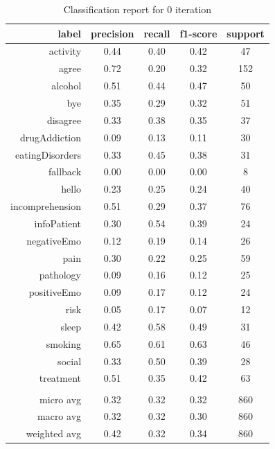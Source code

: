 \documentclass[11pt]{article}
\begin{document}
\begin{table}[htb]
\begin{center}
\begin{tabular}{ |r|c|c|c|c| }
\hline
label 			& precision & recall & f1-score & support\\ \hline 
activity 		& 0.44 & 0.40 & 0.42 &  47\\ \hline 
agree 			& 0.72 & 0.20 & 0.32 & 152\\ \hline 
alcohol 		& 0.51 & 0.44 & 0.47 &  50\\ \hline 
bye 			& 0.35 & 0.29 & 0.32 &  51\\ \hline 
disagree 		& 0.33 & 0.38 & 0.35 &  37\\ \hline 
drugAddiction 	& 0.09 & 0.13 & 0.11 &  30\\ \hline 
eatingDisorders & 0.33 & 0.45 & 0.38 &  31\\ \hline 
fallback 		& 0.00 & 0.00 & 0.00 &   8\\ \hline 
hello 			& 0.23 & 0.25 & 0.24 &  40\\ \hline 
incomprehension & 0.51 & 0.29 & 0.37 &  76\\ \hline 
infoPatient 	& 0.30 & 0.54 & 0.39 &  24\\ \hline 
negativeEmo 	& 0.12 & 0.19 & 0.14 &  26\\ \hline 
pain 			& 0.30 & 0.22 & 0.25 &  59\\ \hline 
pathology 		& 0.09 & 0.16 & 0.12 &  25\\ \hline 
positiveEmo 	& 0.09 & 0.17 & 0.12 &  24\\ \hline 
risk 			& 0.05 & 0.17 & 0.07 &  12\\ \hline 
sleep 			& 0.42 & 0.58 & 0.49 &  31\\ \hline 
smoking 		& 0.65 & 0.61 & 0.63 &  46\\ \hline 
social 			& 0.33 & 0.50 & 0.39 &  28\\ \hline 
treatment 		& 0.51 & 0.35 & 0.42 &  63\\ \hline 
\\ \hline 
micro avg 		& 0.32 & 0.32 & 0.32 & 860\\ \hline 
macro avg 		& 0.32 & 0.32 & 0.30 & 860\\ \hline 
weighted avg 	& 0.42 & 0.32 & 0.34 & 860\\ \hline 
\end{tabular}
\caption{Classification report for 0 iteration}
\end{center}
\end{table}
\FloatBarrier
\end{document}
